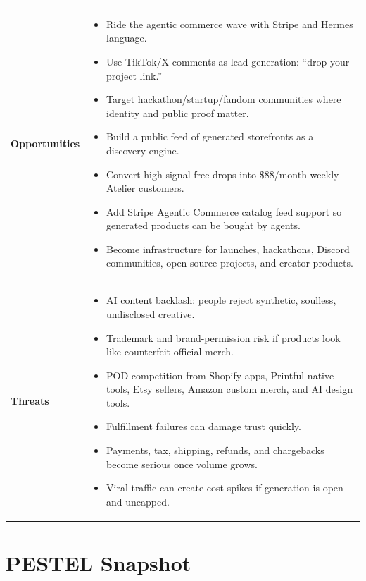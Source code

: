 \documentclass[11pt]{article}
\begin{document}
\begin{longtable}{p{}p{}}
\textbf{Opportunities} &
\begin{itemize}
  \item Ride the agentic commerce wave with Stripe and Hermes language.
  \item Use TikTok/X comments as lead generation: ``drop your project link.''
  \item Target hackathon/startup/fandom communities where identity and public proof matter.
  \item Build a public feed of generated storefronts as a discovery engine.
  \item Convert high-signal free drops into \(\$88\)/month weekly Atelier customers.
  \item Add Stripe Agentic Commerce catalog feed support so generated products can be bought by agents.
  \item Become infrastructure for launches, hackathons, Discord communities, open-source projects, and creator products.
\end{itemize}
\\

\textbf{Threats} &
\begin{itemize}
  \item AI content backlash: people reject synthetic, soulless, undisclosed creative.
  \item Trademark and brand-permission risk if products look like counterfeit official merch.
  \item POD competition from Shopify apps, Printful-native tools, Etsy sellers, Amazon custom merch, and AI design tools.
  \item Fulfillment failures can damage trust quickly.
  \item Payments, tax, shipping, refunds, and chargebacks become serious once volume grows.
  \item Viral traffic can create cost spikes if generation is open and uncapped.
\end{itemize}
\\
\bottomrule
\end{longtable}

\section{PESTEL Snapshot}
\end{document}
